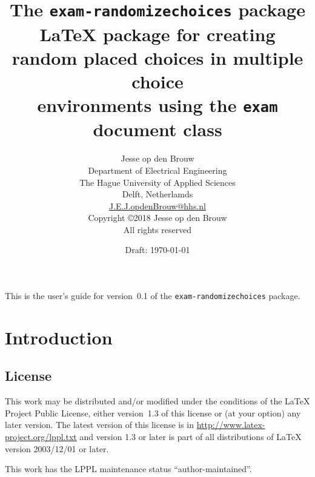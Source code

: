 \documentclass[12pt,a4paper]{exam}
\newcommand{\docversion}{0.1}
\newcommand{\docdate}{Draft: \today}
\begin{document}
\title{The \texttt{exam-randomizechoices} package\\[2ex]\normalsize LaTeX package for creating random placed choices in multiple choice \\environments using the \texttt{exam} document class}

\author{Jesse op den Brouw\\
  Department of Electrical Engineering\\
  The Hague University of Applied Sciences\\
  Delft, Netherlamds\\
  \href{mailto:J.E.J.opdenBrouw@hhs.nl}{J.E.J.opdenBrouw@hhs.nl}\\[\bigskipamount]
  Copyright \copyright 2018 Jesse op den Brouw\\
  All rights reserved}

\date{\docdate}

\maketitle

\vspace*{2cm}

\begin{center}
  \small
  This is the user's guide for version~\docversion{} of the
  \verb|exam-randomizechoices| package. 
\end{center}

\clearpage
\tableofcontents

\clearpage

\section{Introduction}

\subsection{License}
This work may be distributed and/or modified under the
%
%
conditions of the \LaTeX{} Project Public
License, either version~1.3 of this
license or (at your option) any later version.  The latest version
of this license is in \url{http://www.latex-project.org/lppl.txt}
and version 1.3 or later is part of all distributions of \LaTeX{}
version 2003/12/01 or later.

This work has the LPPL maintenance status ``author-maintained''.
\end{document}
